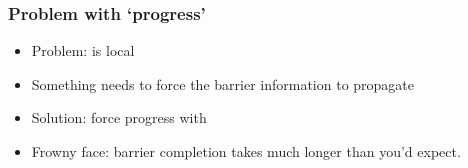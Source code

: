 \begin{frame}[containsverbatim]\frametitle{Problem with `progress'}
\begin{itemize}
\item Problem:  is local
\item Something needs to force the barrier information to propagate
\item Solution: force progress with 
\item Frowny face: barrier completion takes much longer than you'd expect.
\end{itemize}
\end{frame}

